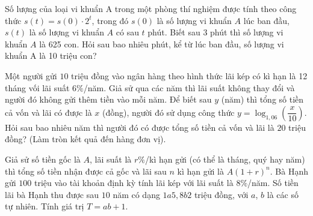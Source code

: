 \begin{ex}%
	Số lượng của loại vi khuẩn A trong một phòng thí nghiệm được tính theo công thức $ s(t)=s(0)\cdot{2^t}$, trong đó $ s(0)$ là số lượng vi khuẩn $ A$ lúc ban đầu, $ s(t)$ là số  lượng vi khuẩn $ A$ có sau $ t$ phút. Biết sau 3 phút thì số lượng vi khuẩn $ A$ là 625 con. Hỏi sau bao nhiêu phút, kể từ lúc ban đầu, số lượng vi khuẩn A là 10 triệu con?\\
\end{ex}

\begin{ex}%
	Một người gửi $10$ triệu đồng vào ngân hàng theo hình thức lãi kép có kì hạn là 12 tháng vối lãi suất $6\%$/năm. Giả sử qua các năm thì lãi suất không thay đổi và người đó không gửi thêm tiền vào mỗi năm. Để biết sau $y$ (năm) thì tổng số tiền cả vốn và lãi có được là $x$ (đồng), người đó sử dụng công thức $y=\log_{1,06}\left(\dfrac{x}{10}\right)$. Hỏi sau bao  nhiêu năm thì người đó có được tổng số tiền cả vốn và lãi là $20$ triệu đồng? (Làm tròn kết quả đến hàng đơn vị).
\end{ex}

\begin{ex}%
	Giả sử số tiền gốc là $A$, lãi suất là $r\%$/kì hạn gửi (có thể là tháng, quý hay năm) thì tổng số  tiền nhận được cả gốc và lãi sau $n$ kì hạn gửi là $A(1+r)^n$. Bà Hạnh gửi $100$ triệu vào tài khoản định kỳ tính lãi kép với lãi suất là $8\%$/năm. Số tiền lãi bà Hạnh thu được sau $10$ năm có dạng $1a5{,}8b2$ triệu đồng, với $a$, $b$ là các số tự nhiên. Tính giá trị $T=a b+1$.
\end{ex}

